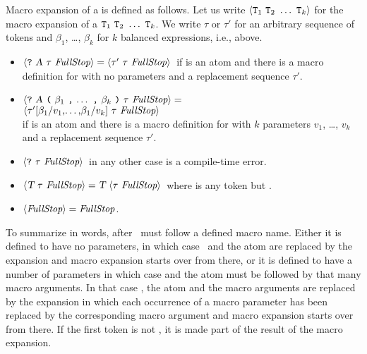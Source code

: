 Macro expansion of a  is defined as follows.  Let us
write $\langle\TZ{T}_1\ \TZ{T}_2\ \ldots\ \TZ{T}_k\rangle$ for the
macro expansion of a  ${\tt{\sl T}}_1\ {\tt{\sl T}}_2\ \ldots\
{\tt{\sl T}}_k$.  We write $\tau$ or $\tau'$ for an arbitrary sequence of
tokens and $\beta_1$, \ldots, $\beta_k$ for $k$ balanced expressions,
i.e., \NT{BalancedExpr} above.
\begin{itemize}
\item $\langle\text{\T{?}\  $\tau$ \NT{FullStop}}\rangle = \langle\text{$\tau'$ $\tau$
\NT{FullStop}}\rangle$\ if  is an atom and there is a macro definition for \TZ{A} with no
parameters and a replacement sequence $\tau'$.
\item $\langle\text{{\tt?}\ {\tt{\sl A}} {\tt(} $\beta_1$ {\tt,}\ \ldots\ {\tt,}\ $\beta_k$ {\tt)} $\tau$ {\it FullStop}}\rangle = \text{}$ \\
\hfil$\langle\text{$\tau'$[$\beta_1$/$v_1$,\ldots,$\beta_1$/$v_k$] $\tau$ {\it FullStop}}\rangle$ \\
if  is an atom and there is a macro definition for \TZ{A} with $k$ parameters
$v_1$, \ldots, $v_k$ and a replacement sequence $\tau'$.
\item $\langle\text{{\tt?}\ $\tau$ {\it FullStop}}\rangle$\ in any other case is a compile-time error.
\item $\langle\text{ $\tau$ \NT{FullStop}}\rangle = \text{\TZ{T} $\langle\text{$\tau$ \NT{FullStop}}\rangle$}$\
where \TZ{T} is any token but .
\item $\langle\text{{\it FullStop}}\rangle = {\it FullStop}$.
\end{itemize}
To summarize in words, after \ must follow a defined macro name.
Either it is defined to have no parameters, in which case \ and
the atom are replaced by the expansion and macro expansion starts over from there,
or it is defined to have a number of parameters in which case  and the atom
must be followed by that many macro arguments.  In that case
\T{?}, the atom and the macro arguments are replaced by the expansion in which each
occurrence of a macro parameter has been replaced by the corresponding macro argument
and macro expansion starts over from there.  If the first token is not \T{?}, it is
made part of the result of the macro expansion.

